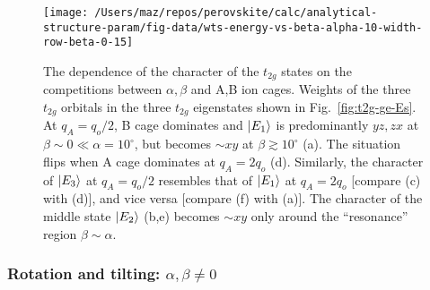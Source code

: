\documentclass[a4paper,prb,twocolumn]{revtex4-1}  %
\begin{document}
\begin{figure}[htbp]
\begin{center}
\texttt{[image: /Users/maz/repos/perovskite/calc/analytical-structure-param/fig-data/wts-energy-vs-beta-alpha-10-width-row-beta-0-15]}
\caption{
The dependence of the character of the $t_{2g}$ states
on the competitions between
$\alpha,\beta$ and 
A,B ion cages.
Weights of the three $t_{2g}$ orbitals in the three 
$t_{2g}$ eigenstates 
shown in
Fig.~\ref{fig:t2g-ge-Es}.
At $q_A=q_o/2$, B cage dominates and
$\ket{E_1}$ is predominantly $yz,zx$ at $\beta\sim 0\ll\alpha=10^\circ$, but 
becomes $\sim xy$ at $\beta\gtrsim10^\circ$ (a).
The situation flips when A cage dominates at $q_A=2q_o$ (d).
Similarly, the character of $\ket{E_3}$ at 
$q_A=q_o/2$
resembles 
that of $\ket{E_1}$ at $q_A=2q_o$  [compare (c) with (d)], and vice versa [compare (f) with (a)].
The character of the middle state $\ket{E_2}$ (b,e)
becomes $\sim xy$ only around the ``resonance'' region
$\beta\sim \alpha$.
}
\label{fig:t2g-ge-wts}
\end{center}
\end{figure}


\subsubsection{Rotation and tilting: $\alpha,\beta\neq 0$}
\label{sec:t2g-gen}
\end{document}
